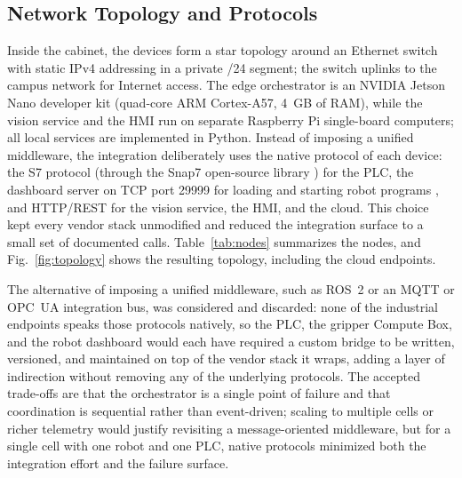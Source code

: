 \documentclass[conference]{IEEEtran}
\begin{document}
\subsection{Network Topology and Protocols}
Inside the cabinet, the devices form a star topology around an Ethernet switch with static IPv4 addressing in a private /24 segment; the switch uplinks to the campus network for Internet access. The edge orchestrator is an NVIDIA Jetson Nano developer kit (quad-core ARM Cortex-A57, 4~GB of RAM), while the vision service and the HMI run on separate Raspberry Pi single-board computers; all local services are implemented in Python.
Instead of imposing a unified middleware, the integration deliberately uses the native protocol of each device: the S7 protocol (through the Snap7 open-source library \cite{b13}) for the PLC, the dashboard server on TCP port 29999 for loading and starting robot programs \cite{b14}, and HTTP/REST for the vision service, the HMI, and the cloud. This choice kept every vendor stack unmodified and reduced the integration surface to a small set of documented calls. Table~\ref{tab:nodes} summarizes the nodes, and Fig.~\ref{fig:topology} shows the resulting topology, including the cloud endpoints.

The alternative of imposing a unified middleware, such as ROS~2 \cite{b16} or an MQTT or OPC~UA integration bus, was considered and discarded: none of the industrial endpoints speaks those protocols natively, so the PLC, the gripper Compute Box, and the robot dashboard would each have required a custom bridge to be written, versioned, and maintained on top of the vendor stack it wraps, adding a layer of indirection without removing any of the underlying protocols. The accepted trade-offs are that the orchestrator is a single point of failure and that coordination is sequential rather than event-driven; scaling to multiple cells or richer telemetry would justify revisiting a message-oriented middleware, but for a single cell with one robot and one PLC, native protocols minimized both the integration effort and the failure surface.
\end{document}
